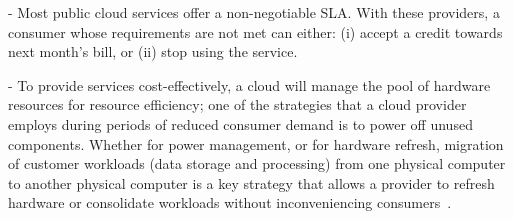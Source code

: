 - Most public cloud services offer a non-negotiable SLA. With these providers, a consumer whose requirements are not met can either: (i) accept a credit towards next month's bill, or (ii) stop using the service.

- To provide services cost-effectively, a cloud will manage the pool of hardware resources for resource efficiency; one of the strategies that a cloud provider employs during periods of reduced consumer demand is to power off unused components. Whether for power management, or for hardware refresh, migration of customer workloads (data storage and processing) from one physical computer to another physical computer is a key strategy that allows a provider to refresh hardware or consolidate workloads without inconveniencing consumers~\cite{BGP+12}.


